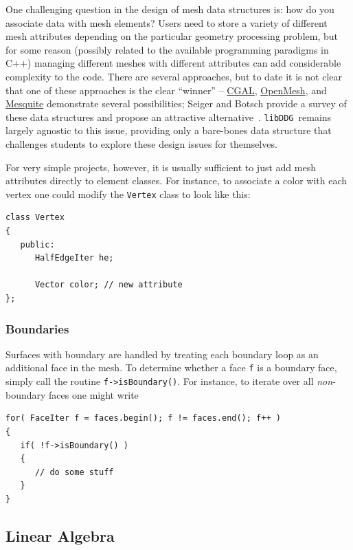 \documentclass{article}
\newcommand{\libddg}{\texttt{libDDG}\ }
\begin{document}
One challenging question in the design of mesh data structures is: how do you associate data with mesh elements?  Users need to store a variety of different mesh attributes depending on the particular geometry processing problem, but for some reason (possibly related to the available programming paradigms in C++) managing different meshes with different attributes can add considerable complexity to the code.  There are several approaches, but to date it is not clear that one of these approaches is the clear ``winner'' -- \href{http://www.cgal.org/}{CGAL}, \href{http://www.openmesh.org/index.php?id=214}{OpenMesh}, and \href{http://www.cs.sandia.gov/optimization/knupp/Introduction.htm}{Mesquite} demonstrate several possibilities; Seiger and Botsch provide a survey of these data structures and propose an attractive alternative~\cite{Seiger:2011:DIE}.  \libddg remains largely agnostic to this issue, providing only a bare-bones data structure that challenges students to explore these design issues for themselves.

For very simple projects, however, it is usually sufficient to just add mesh attributes directly to element classes.  For instance, to associate a color with each vertex one could modify the \texttt{Vertex} class to look like this:

\begin{verbatim}
class Vertex
{
   public:
      HalfEdgeIter he;

      Vector color; // new attribute
};
\end{verbatim}

\subsubsection{Boundaries}

Surfaces with boundary are handled by treating each boundary loop as an additional face in the mesh.  To determine whether a face \texttt{f} is a boundary face, simply call the routine \texttt{f->isBoundary()}.  For instance, to iterate over all \emph{non}-boundary faces one might write

\begin{verbatim}
for( FaceIter f = faces.begin(); f != faces.end(); f++ )
{
   if( !f->isBoundary() )
   {
      // do some stuff
   }
}
\end{verbatim}

\pagebreak
\subsection{Linear Algebra}
\end{document}
